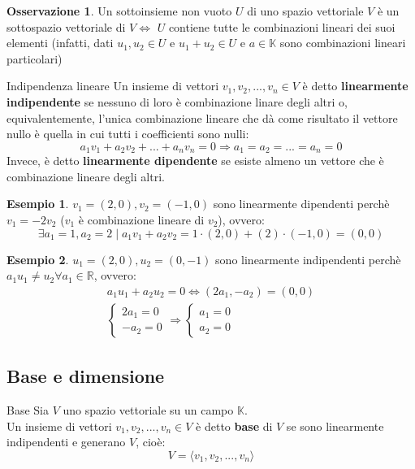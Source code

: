\documentclass[a4paper]{article}
\theoremstyle{definition}
\newtheorem*{oss}{Osservazione}
\newtheorem*{es}{Esempio}
\begin{document}
\begin{oss}
	Un sottoinsieme non vuoto $U$ di uno spazio vettoriale $V$ è un sottospazio vettoriale di $V \Leftrightarrow$ $U$ contiene tutte le combinazioni lineari dei suoi elementi (infatti, dati $u_1, u_2 \in U$ e $u_1 + u_2 \in U$ e $a \in \mathbb{K}$ sono combinazioni lineari particolari)
\end{oss}

\begin{deff}{Indipendenza lineare}{}
	Un insieme di vettori $v_1, v_2, ..., v_n \in V$ è detto \textbf{linearmente indipendente} se nessuno di loro è combinazione linare degli altri o, equivalentemente,
	l'unica combinazione lineare che dà come risultato il vettore nullo è quella in cui tutti i coefficienti sono nulli:
	\[ a_1v_1 + a_2v_2 + ... + a_nv_n = 0 \Rightarrow a_1 = a_2 = ... = a_n = 0 \]
	Invece, è detto \textbf{linearmente dipendente} se esiste almeno un vettore che è combinazione lineare degli altri.
\end{deff}
\begin{es}
	$v_1 = (2, 0), v_2 = (-1, 0)$ sono linearmente dipendenti perchè $v_1 = -2v_2$ ($v_1$ è combinazione lineare di $v_2$), ovvero:
	\[ \exists a_1 = 1, a_2 = 2 \mid a_1v_1 + a_2v_2 = 1 \cdot (2, 0) + (2) \cdot (-1, 0) = (0, 0) \]
\end{es}
\begin{es}
	$u_1 = (2, 0), u_2 = (0, -1)$ sono linearmente indipendenti perchè $a_1u_1 \ne u_2 \forall a_1 \in \mathbb{R}$, ovvero:
	\begin{align*}
		a_1u_1 + a_2u_2 = 0 \Leftrightarrow (2a_1, - a_2) = (0, 0) \\
		\begin{cases}
			2a_1 = 0 \\
			-a_2 = 0
		\end{cases}
		\Rightarrow
		\begin{cases}
			a_1 = 0 \\
			a_2 = 0
		\end{cases}
	\end{align*}
\end{es}

\subsection{Base e dimensione}
\begin{deff}{Base}{}
	Sia $V$ uno spazio vettoriale su un campo $\mathbb{K}$. \\
	Un insieme di vettori $v_1, v_2, ..., v_n \in V$ è detto \textbf{base} di $V$ se sono linearmente indipendenti e generano $V$, cioè:
	\[ V = \langle v_1, v_2, ..., v_n \rangle \]
\end{deff}
\end{document}
